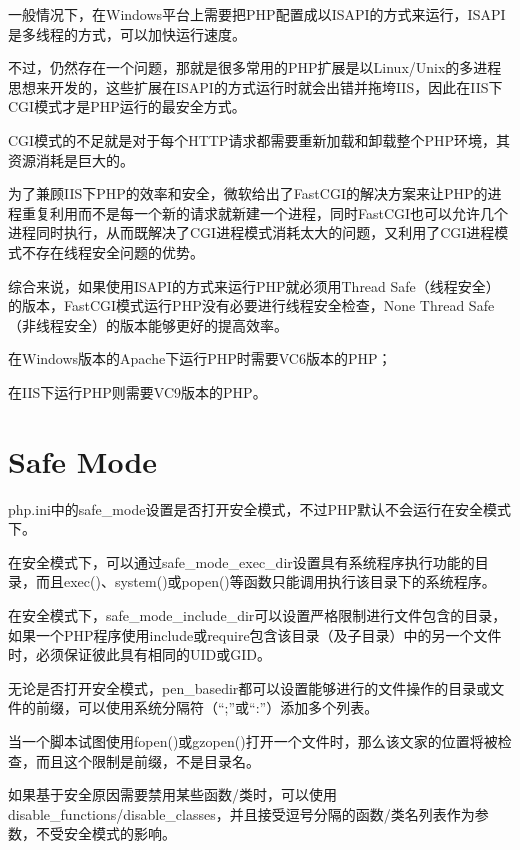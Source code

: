 一般情况下，在Windows平台上需要把PHP配置成以ISAPI的方式来运行，ISAPI是多线程的方式，可以加快运行速度。


不过，仍然存在一个问题，那就是很多常用的PHP扩展是以Linux/Unix的多进程思想来开发的，这些扩展在ISAPI的方式运行时就会出错并拖垮IIS，因此在IIS下CGI模式才是PHP运行的最安全方式。

CGI模式的不足就是对于每个HTTP请求都需要重新加载和卸载整个PHP环境，其资源消耗是巨大的。

为了兼顾IIS下PHP的效率和安全，微软给出了FastCGI的解决方案来让PHP的进程重复利用而不是每一个新的请求就新建一个进程，同时FastCGI也可以允许几个进程同时执行，从而既解决了CGI进程模式消耗太大的问题，又利用了CGI进程模式不存在线程安全问题的优势。

综合来说，如果使用ISAPI的方式来运行PHP就必须用Thread Safe（线程安全）的版本，FastCGI模式运行PHP没有必要进行线程安全检查，None Thread Safe（非线程安全）的版本能够更好的提高效率。

\begin{compactitem}
\item 在Windows版本的Apache下运行PHP时需要VC6版本的PHP；
\item 在IIS下运行PHP则需要VC9版本的PHP。
\end{compactitem}

\section{Safe Mode}

php.ini中的safe\_mode设置是否打开安全模式，不过PHP默认不会运行在安全模式下。

在安全模式下，可以通过safe\_mode\_exec\_dir设置具有系统程序执行功能的目录，而且exec()、system()或popen()等函数只能调用执行该目录下的系统程序。

在安全模式下，safe\_mode\_include\_dir可以设置严格限制进行文件包含的目录，如果一个PHP程序使用include或require包含该目录（及子目录）中的另一个文件时，必须保证彼此具有相同的UID或GID。

无论是否打开安全模式，pen\_basedir都可以设置能够进行的文件操作的目录或文件的前缀，可以使用系统分隔符（“;”或“:”）添加多个列表。

当一个脚本试图使用fopen()或gzopen()打开一个文件时，那么该文家的位置将被检查，而且这个限制是前缀，不是目录名。

如果基于安全原因需要禁用某些函数/类时，可以使用disable\_functions/disable\_classes，并且接受逗号分隔的函数/类名列表作为参数，不受安全模式的影响。










